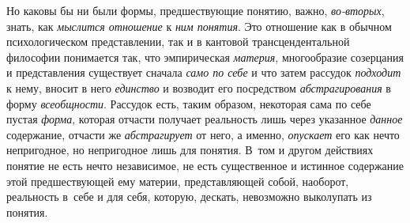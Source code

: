 Но каковы бы ни были формы, предшествующие понятию, важно,
{\em во-вторых}, знать, как {\em мыслится отношение} к {\em ним понятия}.
Это отношение как в обычном психологическом представлении,
так и в кантовой трансцендентальной философии понимается так, что
эмпирическая {\em материя},
многообразие созерцания и представления существует сначала
{\em само по себе} и что затем рассудок {\em подходит} к нему, вносит в него
{\em единство} и возводит его посредством {\em абстрагирования} в форму
{\em всеобщности}. Рассудок есть, таким образом, некоторая сама
по себе пустая {\em форма},
которая отчасти получает реальность лишь через указанное
{\em данное} содержание, отчасти же {\em абстрагирует}
от него, а именно, {\em опускает} его как
нечто непригодное, но непригодное лишь для понятия. В~том и другом
действиях понятие не есть нечто независимое, не есть существенное и
истинное содержание этой предшествующей ему материи, представляющей собой,
наоборот, реальность в~себе и для себя, которую, дескать, невозможно
выколупать из понятия.

